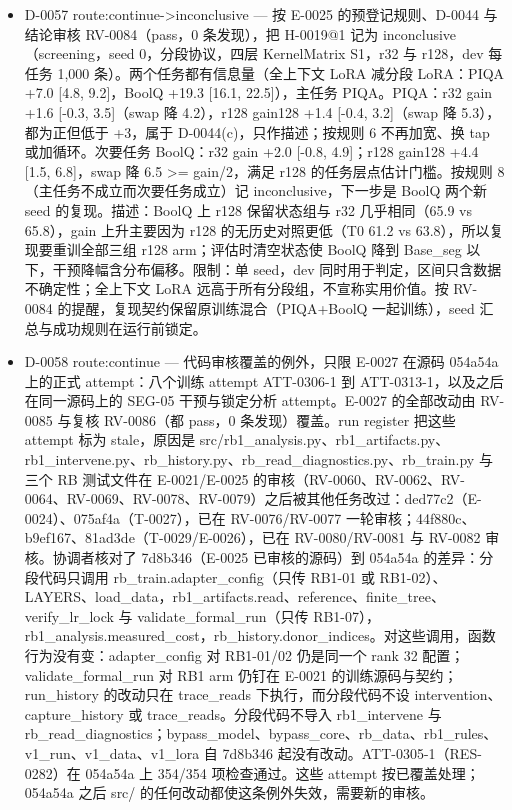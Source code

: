 \documentclass[11pt]{article}
\begin{document}
\begin{itemize}
\item D-0057 route:continue-\textgreater{}inconclusive --- 按 E-0025 的预登记规则、D-0044 与结论审核 RV-0084（pass，0 条发现），把 H-0019@1 记为 inconclusive（screening，seed 0，分段协议，四层 KernelMatrix S1，r32 与 r128，dev 每任务 1,000 条）。两个任务都有信息量（全上下文 LoRA 减分段 LoRA：PIQA +7.0 [4.8, 9.2]，BoolQ +19.3 [16.1, 22.5]），主任务 PIQA。PIQA：r32 gain +1.6 [-0.3, 3.5]（swap 降 4.2），r128 gain128 +1.4 [-0.4, 3.2]（swap 降 5.3），都为正但低于 +3，属于 D-0044(c)，只作描述；按规则 6 不再加宽、换 tap 或加循环。次要任务 BoolQ：r32 gain +2.0 [-0.8, 4.9]；r128 gain128 +4.4 [1.5, 6.8]，swap 降 6.5 \textgreater{}= gain/2，满足 r128 的任务层点估计门槛。按规则 8（主任务不成立而次要任务成立）记 inconclusive，下一步是 BoolQ 两个新 seed 的复现。描述：BoolQ 上 r128 保留状态组与 r32 几乎相同（65.9 vs 65.8），gain 上升主要因为 r128 的无历史对照更低（T0 61.2 vs 63.8），所以复现要重训全部三组 r128 arm；评估时清空状态使 BoolQ 降到 Base\_seg 以下，干预降幅含分布偏移。限制：单 seed，dev 同时用于判定，区间只含数据不确定性；全上下文 LoRA 远高于所有分段组，不宣称实用价值。按 RV-0084 的提醒，复现契约保留原训练混合（PIQA+BoolQ 一起训练），seed 汇总与成功规则在运行前锁定。
\item D-0058 route:continue --- 代码审核覆盖的例外，只限 E-0027 在源码 054a54a 上的正式 attempt：八个训练 attempt ATT-0306-1 到 ATT-0313-1，以及之后在同一源码上的 SEG-05 干预与锁定分析 attempt。E-0027 的全部改动由 RV-0085 与复核 RV-0086（都 pass，0 条发现）覆盖。run register 把这些 attempt 标为 stale，原因是 src/rb1\_analysis.py、rb1\_artifacts.py、rb1\_intervene.py、rb\_history.py、rb\_read\_diagnostics.py、rb\_train.py 与三个 RB 测试文件在 E-0021/E-0025 的审核（RV-0060、RV-0062、RV-0064、RV-0069、RV-0078、RV-0079）之后被其他任务改过：ded77c2（E-0024）、075af4a（T-0027），已在 RV-0076/RV-0077 一轮审核；44f880c、b9ef167、81ad3de（T-0029/E-0026），已在 RV-0080/RV-0081 与 RV-0082 审核。协调者核对了 7d8b346（E-0025 已审核的源码）到 054a54a 的差异：分段代码只调用 rb\_train.adapter\_config（只传 RB1-01 或 RB1-02）、LAYERS、load\_data，rb1\_artifacts.read、reference、finite\_tree、verify\_lr\_lock 与 validate\_formal\_run（只传 RB1-07），rb1\_analysis.measured\_cost，rb\_history.donor\_indices。对这些调用，函数行为没有变：adapter\_config 对 RB1-01/02 仍是同一个 rank 32 配置；validate\_formal\_run 对 RB1 arm 仍钉在 E-0021 的训练源码与契约；run\_history 的改动只在 trace\_reads 下执行，而分段代码不设 intervention、capture\_history 或 trace\_reads。分段代码不导入 rb1\_intervene 与 rb\_read\_diagnostics；bypass\_model、bypass\_core、rb\_data、rb1\_rules、v1\_run、v1\_data、v1\_lora 自 7d8b346 起没有改动。ATT-0305-1（RES-0282）在 054a54a 上 354/354 项检查通过。这些 attempt 按已覆盖处理；054a54a 之后 src/ 的任何改动都使这条例外失效，需要新的审核。

\end{itemize}
\end{document}
